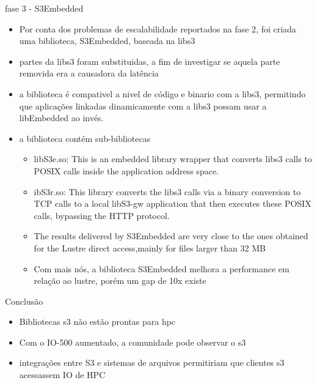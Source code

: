 \documentclass{beamer}
\begin{document}
\begin{frame}{fase 3 - S3Embedded}
	\begin{itemize}
		\item Por conta dos problemas de escalabilidade reportados na fase 2, foi criada uma biblioteca, S3Embedded, baseada na libs3
		\item partes da libs3 foram substituidas, a fim de investigar se aquela parte removida era a causadora da latência
		\item a biblioteca é compativel a nivel de código e binario com a libs3, permitindo que aplicações linkadas dinamicamente com a libs3 possam usar a libEmbedded ao invés.
		\item a biblioteca contém sub-bibliotecas
		\begin{itemize}
			\item libS3e.so: This is an embedded library wrapper that converts libs3 calls to POSIX calls
			inside the application address space.
			\item ibS3r.so: This library converts the libs3 calls via a binary conversion to TCP calls to a local
			libS3-gw application that then executes these POSIX calls, bypassing the HTTP protocol.
			\item The results delivered by S3Embedded are very close to the ones obtained for the
			Lustre direct access,mainly for files larger than 32 MB
			\item Com mais nós, a biblioteca S3Embedded melhora a performance em relação ao lustre, porém um gap de 10x existe
		\end{itemize}
	\end{itemize}
\end{frame}
\begin{frame}{Conclusão}
	\begin{itemize}
		\item Bibliotecas s3 não estão prontas para hpc
		\item Com o IO-500 aumentado, a comunidade pode observar o s3
		\item integrações entre S3 e sistemas de arquivos permitiriam que clientes s3 acessassem IO de HPC
	\end{itemize}
\end{frame}
\end{document}
